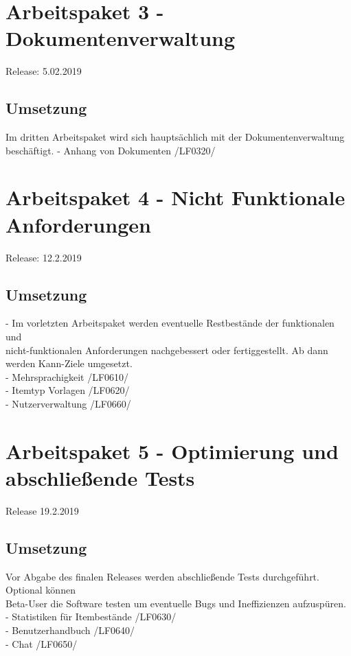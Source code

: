 \documentclass[11pt,a4paper]{report}
\begin{document}
\section{Arbeitspaket 3 - Dokumentenverwaltung}
Release: 5.02.2019 \\
\subsection{Umsetzung}
Im dritten Arbeitspaket wird sich hauptsächlich mit der Dokumentenverwaltung beschäftigt. 
- Anhang von Dokumenten /LF0320/ \\
\section{Arbeitspaket 4 - Nicht Funktionale Anforderungen }
Release: 12.2.2019 \\
\subsection{Umsetzung}
- Im vorletzten Arbeitspaket werden eventuelle Restbestände der funktionalen und\\ nicht-funktionalen Anforderungen nachgebessert oder fertiggestellt. Ab dann werden Kann-Ziele umgesetzt.\\
- Mehrsprachigkeit /LF0610/ \\
- Itemtyp Vorlagen /LF0620/ \\
- Nutzerverwaltung /LF0660/ \\
\section{Arbeitspaket 5 - Optimierung und abschließende Tests}
Release 19.2.2019 \\
\subsection{Umsetzung}
Vor Abgabe des finalen Releases werden abschließende Tests durchgeführt. Optional können\\ Beta-User die Software testen um eventuelle Bugs und Ineffizienzen aufzuspüren. \\
- Statistiken für Itembestände /LF0630/ \\
- Benutzerhandbuch /LF0640/ \\
- Chat /LF0650/ \\
\end{document}
